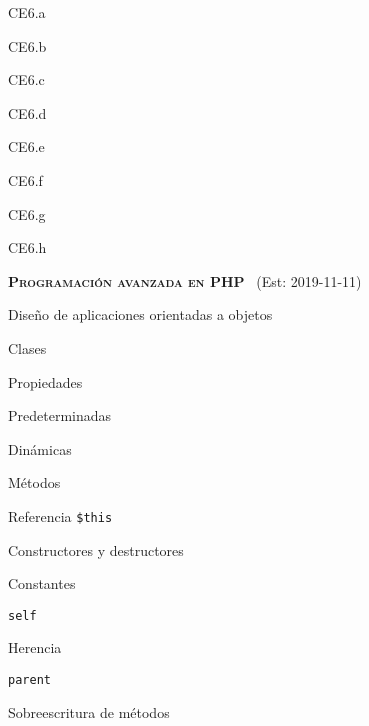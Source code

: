 \begin{longenum}
\begin{longenum}
\begin{longenum}
\begin{longenum}
\begin{longenum}
                    \item CE6.a
                    \item CE6.b
                    \item CE6.c
                    \item CE6.d
                    \item CE6.e
                    \item CE6.f
                    \item CE6.g
                    \item CE6.h
                \end{longenum}
            \end{longenum}
        \end{longenum}
    \end{longenum}
    \item \textbf{\textsc{Programación avanzada en PHP}} \ (Est: 2019-11-11)
    \begin{longenum}
        \item Diseño de aplicaciones orientadas a objetos
        \begin{longenum}
            \item Clases
            \item Propiedades
            \begin{longenum}
                \item Predeterminadas
                \item Dinámicas
            \end{longenum}
            \item Métodos
            \begin{longenum}
                \item Referencia \texttt{\$this}
                \item Constructores y destructores
            \end{longenum}
            \item Constantes
            \begin{longenum}
                \item \texttt{self}
            \end{longenum}
            \item Herencia
            \begin{longenum}
                \item \texttt{parent}
                \item Sobreescritura de métodos
            \end{longenum}

\end{longenum}
\end{longenum}
\end{longenum}
